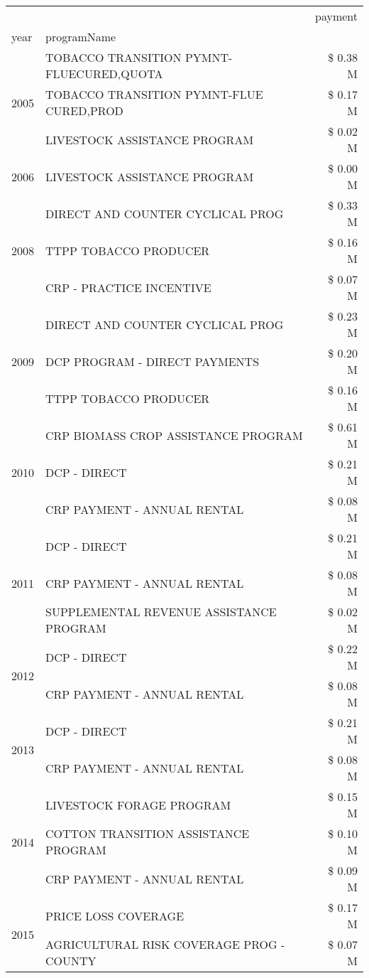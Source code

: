 \begin{tabular}{llr}
\toprule
 &  & payment \\
year & programName &  \\
\midrule
\multirow[t]{3}{*}{2005} & TOBACCO TRANSITION PYMNT-FLUECURED,QUOTA & \$ 0.38 M \\
 & TOBACCO TRANSITION PYMNT-FLUE CURED,PROD & \$ 0.17 M \\
 & LIVESTOCK ASSISTANCE PROGRAM & \$ 0.02 M \\
\cline{1-3}
2006 & LIVESTOCK ASSISTANCE PROGRAM & \$ 0.00 M \\
\cline{1-3}
\multirow[t]{3}{*}{2008} & DIRECT AND COUNTER CYCLICAL PROG & \$ 0.33 M \\
 & TTPP TOBACCO PRODUCER & \$ 0.16 M \\
 & CRP - PRACTICE INCENTIVE & \$ 0.07 M \\
\cline{1-3}
\multirow[t]{3}{*}{2009} & DIRECT AND COUNTER CYCLICAL PROG & \$ 0.23 M \\
 & DCP PROGRAM - DIRECT PAYMENTS & \$ 0.20 M \\
 & TTPP TOBACCO PRODUCER & \$ 0.16 M \\
\cline{1-3}
\multirow[t]{3}{*}{2010} & CRP BIOMASS CROP ASSISTANCE PROGRAM & \$ 0.61 M \\
 & DCP - DIRECT & \$ 0.21 M \\
 & CRP PAYMENT - ANNUAL RENTAL & \$ 0.08 M \\
\cline{1-3}
\multirow[t]{3}{*}{2011} & DCP - DIRECT & \$ 0.21 M \\
 & CRP PAYMENT - ANNUAL RENTAL & \$ 0.08 M \\
 & SUPPLEMENTAL REVENUE ASSISTANCE PROGRAM & \$ 0.02 M \\
\cline{1-3}
\multirow[t]{2}{*}{2012} & DCP - DIRECT & \$ 0.22 M \\
 & CRP PAYMENT - ANNUAL RENTAL & \$ 0.08 M \\
\cline{1-3}
\multirow[t]{2}{*}{2013} & DCP - DIRECT & \$ 0.21 M \\
 & CRP PAYMENT - ANNUAL RENTAL & \$ 0.08 M \\
\cline{1-3}
\multirow[t]{3}{*}{2014} & LIVESTOCK FORAGE PROGRAM & \$ 0.15 M \\
 & COTTON TRANSITION ASSISTANCE PROGRAM & \$ 0.10 M \\
 & CRP PAYMENT - ANNUAL RENTAL & \$ 0.09 M \\
\cline{1-3}
\multirow[t]{3}{*}{2015} & PRICE LOSS COVERAGE & \$ 0.17 M \\
 & AGRICULTURAL RISK COVERAGE PROG - COUNTY & \$ 0.07 M \\

\end{tabular}
